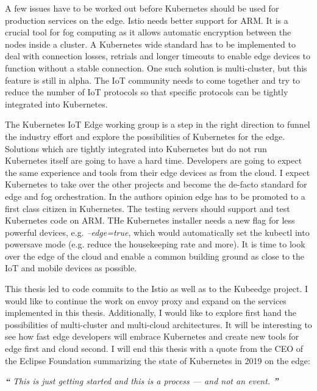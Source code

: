 A few issues have to be worked out before Kubernetes should be used for production services on the edge. Istio needs better support for ARM. It is a crucial tool for fog computing as it allows automatic encryption between the nodes inside a cluster. A Kubernetes wide standard has to be implemented to deal with connection losses, retrials and longer timeouts to enable edge devices to function without a stable connection. One such solution is multi-cluster, but this feature is still in alpha. The IoT community needs to come together and try to reduce the number of IoT protocols so that specific protocols can be tightly integrated into Kubernetes.  

The Kubernetes IoT Edge working group\cite{IntroducingDejanBosanac:KubernetesIoTEdgeWorkingGroup} is a step in the right direction to funnel the industry effort and explore the possibilities of Kubernetes for the edge. Solutions which are tightly integrated into Kubernetes but do not run Kubernetes itself are going to have a hard time. Developers are going to expect the same experience and tools from their edge devices as from the cloud. I expect Kubernetes to take over the other projects and become the de-facto standard for edge and fog orchestration. In the authors opinion edge has to be promoted to a first class citizen in Kubernetes. The testing servers should support and test Kubernetes code on ARM. THe Kubernetes installer needs a new flag for less powerful devices, e.g. \textit{--edge=true}, which would automatically set the kubectl into powersave mode (e.g. reduce the housekeeping rate and more). It is time to look over the edge of the cloud and enable a common building ground as close to the IoT and mobile devices as possible.

This thesis led to code commits to the Istio as well as to the Kubeedge project. I would like to continue the work on envoy proxy and expand on the services implemented in this thesis. Additionally, I would like to explore first hand the possibilities of multi-cluster and multi-cloud architectures. It will be interesting to see how fast edge developers will embrace Kubernetes and create new tools for edge first and cloud second.
I will end this thesis with a quote from the CEO of the Eclipse Foundation summarizing the state of Kubernetes in 2019 on the edge:
\begin{displayquote}
\textit{\textbf{\Huge{``}}}
\textit{\large{
This is just getting started and this is a process — and not an event.\cite{ioFogMainBlog:online}
}}
\textit{\textbf{\Huge{''}}}
\\[1pt]
\end{displayquote}
